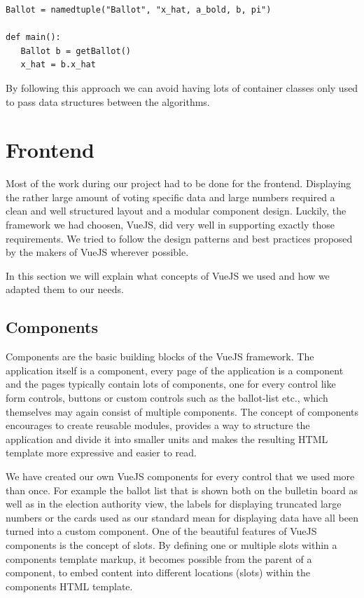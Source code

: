 \begin{verbatim}
Ballot = namedtuple("Ballot", "x_hat, a_bold, b, pi")

def main():
   Ballot b = getBallot()
   x_hat = b.x_hat
\end{verbatim}

By following this approach we can avoid having lots of container classes only used to pass data structures between the algorithms.

\section{Frontend}
Most of the work during our project had to be done for the frontend. Displaying the rather large amount of voting specific data and large numbers required a clean and well structured layout and a modular component design. Luckily, the framework we had choosen, VueJS, did very well in supporting exactly those requirements. We tried to follow the design patterns and best practices proposed by the makers of VueJS wherever possible.

In this section we will explain what concepts of VueJS we used and how we adapted them to our needs.

\subsection{Components}
Components are the basic building blocks of the VueJS framework. The application itself is a component, every page of the application is a component and the pages typically contain lots of components, one for every control like form controls, buttons or custom controls such as the ballot-list etc., which themselves may again consist of multiple components. The concept of components encourages to create reusable modules, provides a way to structure the application and divide it into smaller units and makes the resulting HTML template more expressive and easier to read.

We have created our own VueJS components for every control that we used more than once. For example the ballot list that is shown both on the bulletin board as well as in the election authority view, the labels for displaying truncated large numbers or the cards used as our standard mean for displaying data have all been turned into a custom component. One of the beautiful features of VueJS components is the concept of slots. By defining one or multiple slots within a components template markup, it becomes possible from the parent of a component, to embed content into different locations (slots) within the components HTML template.

